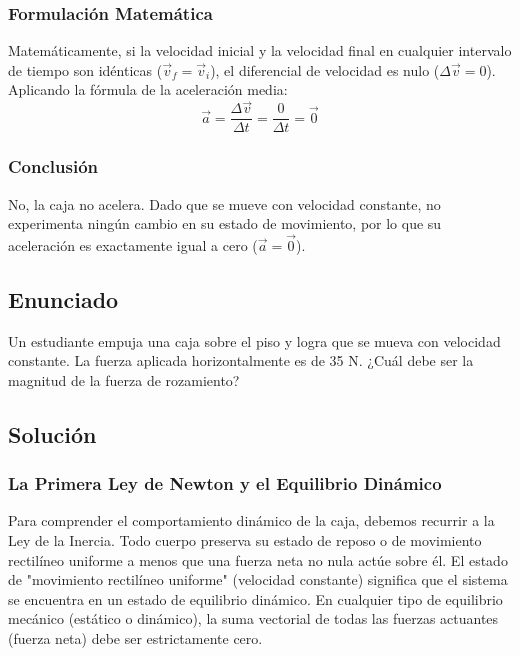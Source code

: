 \documentclass[12pt]{article}
\begin{document}
\subsubsection*{Formulación Matemática}
Matemáticamente, si la velocidad inicial y la velocidad final en cualquier intervalo de tiempo son idénticas ($\vec{v}_f = \vec{v}_i$), el diferencial de velocidad es nulo ($\Delta \vec{v} = 0$). Aplicando la fórmula de la aceleración media:
\begin{equation}
    \vec{a} = \frac{\Delta \vec{v}}{\Delta t} = \frac{0}{\Delta t} = \vec{0}
\end{equation}

\subsubsection*{Conclusión}
No, la caja no acelera. Dado que se mueve con velocidad constante, no experimenta ningún cambio en su estado de movimiento, por lo que su aceleración es exactamente igual a cero ($\vec{a} = \vec{0}$).

\newpage

\subsection*{Enunciado}
Un estudiante empuja una caja sobre el piso y logra que se mueva con velocidad constante. La fuerza aplicada horizontalmente es de 35 N. ¿Cuál debe ser la magnitud de la fuerza de rozamiento?

\subsection*{Solución}

\subsubsection*{La Primera Ley de Newton y el Equilibrio Dinámico}
Para comprender el comportamiento dinámico de la caja, debemos recurrir a la Ley de la Inercia. Todo cuerpo preserva su estado de reposo o de movimiento rectilíneo uniforme a menos que una fuerza neta no nula actúe sobre él. El estado de "movimiento rectilíneo uniforme" (velocidad constante) significa que el sistema se encuentra en un estado de equilibrio dinámico. En cualquier tipo de equilibrio mecánico (estático o dinámico), la suma vectorial de todas las fuerzas actuantes (fuerza neta) debe ser estrictamente cero.
\end{document}
